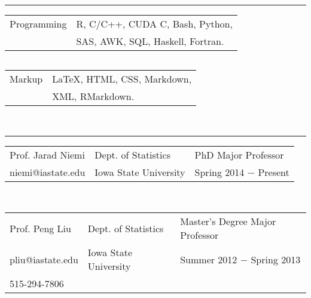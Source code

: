 \documentclass{article}
\newcommand{\q}{$\quad$ \newline}
\newcommand{\vl}{4.25}
\newcommand{\wl}{8.4}
\newcommand{\ww}{13}
\newcommand{\myrule}{\noindent \rule{\textwidth}{1pt}}
\begin{document}



%



\myrule
 
\noindent \begin{tabular}{@{}p{\vl cm}p{\ww cm}@{}}
Programming & R, C/C++, CUDA C, Bash, Python,  \\
 &SAS, AWK, SQL, Haskell, Fortran.  \\
\end{tabular} \q 

\noindent \begin{tabular}{@{}p{\vl cm}p{\ww cm}@{}}
Markup& LaTeX, HTML, CSS, Markdown,  \\
 & XML, RMarkdown.  \\
\end{tabular} \q \q



\myrule

\noindent \begin{tabular}{@{}p{\vl cm}p{\wl cm}l@{}}
Prof. Jarad Niemi & Dept. of Statistics & PhD Major Professor  \\
niemi@iastate.edu & Iowa State University & Spring 2014 $-$ Present \\
\end{tabular} \q \q

\noindent \begin{tabular}{@{}p{\vl cm}p{\wl cm}l@{}}
Prof. Peng Liu & Dept. of Statistics & Master's Degree Major Professor \\
pliu@iastate.edu & Iowa State University & Summer 2012 $-$ Spring 2013 \\
515-294-7806 & & 
\end{tabular} \q \q

\end{document}

